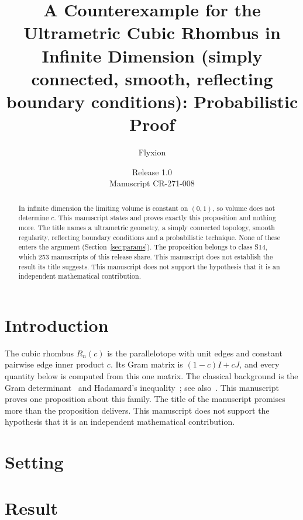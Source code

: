 \documentclass[11pt]{article}
\title{A Counterexample for the Ultrametric Cubic Rhombus in Infinite Dimension (simply connected, smooth, reflecting boundary conditions): Probabilistic Proof}
\author{Flyxion}
\date{Release 1.0\\ Manuscript CR-271-008}
\begin{document}
\maketitle
\begin{abstract}
In infinite dimension the limiting volume is constant on $(0,1)$, so volume does not determine $c$. This manuscript states and proves exactly this proposition and nothing more. The title names a ultrametric geometry, a simply connected topology, smooth regularity, reflecting boundary conditions and a probabilistic technique. None of these enters the argument (Section~\ref{sec:params}). The proposition belongs to class S14, which 253 manuscripts of this release share. This manuscript does not establish the result its title suggests. This manuscript does not support the hypothesis that it is an independent mathematical contribution.
\end{abstract}

\section{Introduction}
The cubic rhombus $R_n(c)$ is the parallelotope with unit edges and constant pairwise edge inner product $c$. Its Gram matrix is $(1-c)I+cJ$, and every quantity below is computed from this one matrix. The classical background is the Gram determinant~\cite{gram} and Hadamard's inequality~\cite{hadamard}; see also~\cite{hj}.
This manuscript proves one proposition about this family. The title of the manuscript promises more than the proposition delivers. This manuscript does not support the hypothesis that it is an independent mathematical contribution.

\section{Setting}


\section{Result}

\end{document}
